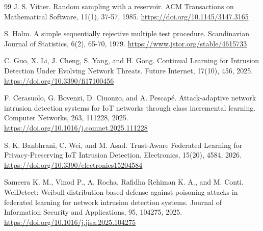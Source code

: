 \documentclass[
  10pt,
  a4paper,
]{article}
\begin{document}
\begin{thebibliography}{99}
 J. S. Vitter. Random sampling with a reservoir. ACM Transactions on Mathematical Software, 11(1), 37-57, 1985. \url{https://doi.org/10.1145/3147.3165}

 S. Holm. A simple sequentially rejective multiple test procedure. Scandinavian Journal of Statistics, 6(2), 65-70, 1979. \url{https://www.jstor.org/stable/4615733}

 C. Guo, X. Li, J. Cheng, S. Yang, and H. Gong. Continual Learning for Intrusion Detection Under Evolving Network Threats. Future Internet, 17(10), 456, 2025. \url{https://doi.org/10.3390/fi17100456}

 F. Cerasuolo, G. Bovenzi, D. Ciuonzo, and A. Pescapé. Attack-adaptive network intrusion detection systems for IoT networks through class incremental learning. Computer Networks, 263, 111228, 2025. \url{https://doi.org/10.1016/j.comnet.2025.111228}

 S. K. Banbhrani, C. Wei, and M. Asad. Trust-Aware Federated Learning for Privacy-Preserving IoT Intrusion Detection. Electronics, 15(20), 4584, 2026. \url{https://doi.org/10.3390/electronics15204584}

 Sameera K. M., Vinod P., A. Rocha, Rafidha Rehiman K. A., and M. Conti. WeiDetect: Weibull distribution-based defense against poisoning attacks in federated learning for network intrusion detection systems. Journal of Information Security and Applications, 95, 104275, 2025. \url{https://doi.org/10.1016/j.jisa.2025.104275}
\end{thebibliography}
\end{document}
